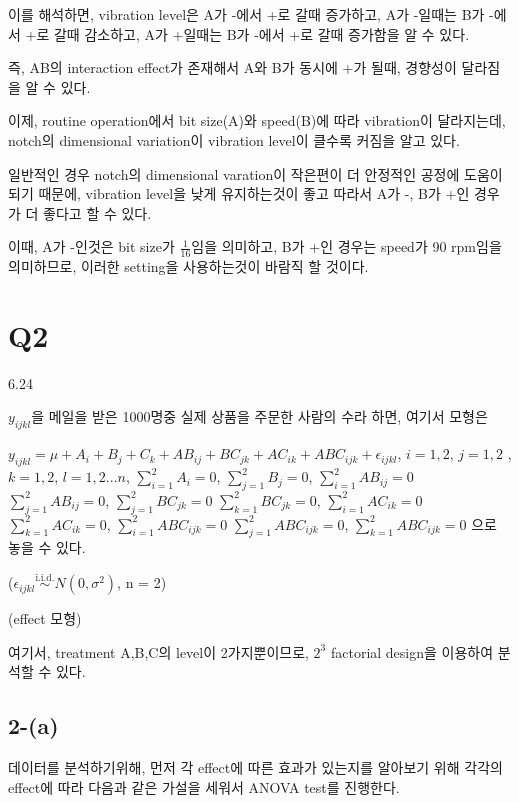 \documentclass{article}
\begin{document}
이를 해석하면, vibration level은 A가 -에서 +로 갈때 증가하고, A가 -일때는 B가 -에서 +로 갈때 감소하고, A가 +일때는 B가 -에서 +로 갈때 증가함을 알 수 있다.

즉, AB의 interaction effect가 존재해서 A와 B가 동시에 +가 될때, 경향성이 달라짐을 알 수 있다.

이제, routine operation에서 bit size(A)와 speed(B)에 따라 vibration이 달라지는데, notch의 dimensional variation이 vibration level이 클수록 커짐을 알고 있다.

일반적인 경우 notch의 dimensional varation이 작은편이 더 안정적인 공정에 도움이 되기 때문에, vibration level을 낮게 유지하는것이 좋고 따라서 A가 -, B가 +인 경우가 더 좋다고 할 수 있다.

이때, A가 -인것은 bit size가 $\frac{1}{16}$임을 의미하고, B가 +인 경우는 speed가 90 rpm임을 의미하므로, 이러한 setting을 사용하는것이 바람직 할 것이다.






\section{Q2} 

6.24


$y_{ijkl}$을 메일을 받은 1000명중 실제 상품을 주문한 사람의 수라 하면, 여기서 모형은


$y_{ijkl} = \mu + A_i + B_j + C_k + AB_{ij} + BC_{jk} + AC_{ik} + ABC_{ijk} + \epsilon_{ijkl}$, $i = 1,2$, $j = 1, 2$ ,$k = 1,2$,  $l = 1, 2... n$, $\sum_{i=1}^2 A_i = 0 $, $\sum_{j=1}^2 B_j = 0 $, $\sum_{i=1}^2 AB_{ij} = 0 $ $\sum_{j=1}^2 AB_{ij} = 0 $, $\sum_{j=1}^2 BC_{jk} = 0 $ $\sum_{k=1}^2 BC_{jk} = 0 $, $\sum_{i=1}^2 AC_{ik} = 0 $ $\sum_{k=1}^2 AC_{ik} = 0 $, $\sum_{i=1}^2 ABC_{ijk} = 0 $ $\sum_{j=1}^2 ABC_{ijk} = 0 $, $\sum_{k=1}^2 ABC_{ijk} = 0 $ 으로 놓을 수 있다.

($\epsilon_{ijkl}  \overset{\text{i.i.d.}}{\sim} N(0, \sigma^2)$, n = 2)

(effect 모형)

여기서, treatment A,B,C의 level이 2가지뿐이므로, $2^3$ factorial design을 이용하여 분석할 수 있다.

\subsection{2-(a)}
데이터를 분석하기위해, 먼저 각 effect에 따른 효과가 있는지를 알아보기 위해 각각의 effect에 따라 다음과 같은 가설을 세워서 ANOVA test를 진행한다.
\end{document}
